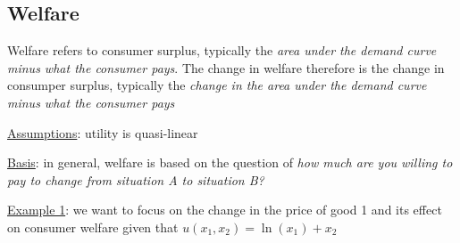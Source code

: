 \documentclass{article}
\begin{document}
\subsection{Welfare}
Welfare refers to consumer surplus, typically the \textit{area under the demand curve minus what the consumer pays}. The change in welfare therefore is the change in consumper surplus, typically the \textit{change in the area under the demand curve minus what the consumer pays} \par \vspace{0.3em}
  \underline{Assumptions}: utility is quasi-linear
  \par
  \underline{Basis}: in general, welfare is based on the question of \textit{how much are you willing to pay to change from situation A to situation B?}
  \par
  \underline{Example 1}: we want to focus on the change in the price of good 1 and its effect on consumer welfare given that $u(x_{1}, x_{2}) = \ln(x_{1}) + x_{2}$
\end{document}
